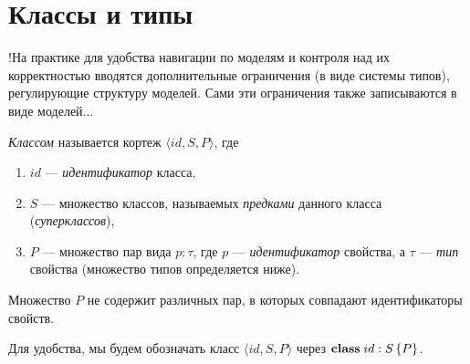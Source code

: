 \section{Классы и типы}

!На практике для удобства навигации по моделям и контроля над их корректностью вводятся дополнительные ограничения (в виде системы типов), регулирующие структуру моделей. Сами эти ограничения также записываются в виде моделей...

\begin{Def}[Класс]
\emph{Классом} называется кортеж $\langle id, S, P \rangle$, где 
\begin{enumerate}
\item $id$ --- \emph{идентификатор} класса,
\item $S$ --- множество классов, называемых \emph{предками} данного класса (\emph{суперклассов}),
\item $P$ --- множество пар вида $p : \tau$, где $p$ --- \emph{идентификатор} свойства, а $\tau$ --- \emph{тип} свойства (множество типов определяется ниже).
\end{enumerate}
Множество $P$ не содержит различных пар, в которых совпадают идентификаторы свойств.
\end{Def}

Для удобства, мы будем обозначать класс $\langle id, S, P \rangle$ через \mbox{$\mathbf{class }\;id : S \left\{P\right\}$}. 

